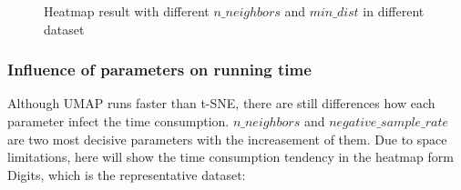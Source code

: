 \begin{enumerate}[1)]
\begin{figure}[H]
\centering  %
\caption{Heatmap result with different $n\_neighbors$ and $min\_dist$ in different dataset}
\end{figure}

\subsubsection{Influence of parameters on running time}

Although UMAP runs faster than t-SNE, there are still differences how each parameter infect the time consumption.  $n\_neighbors$ and $negative\_sample\_rate$ are two most decisive parameters with the increasement of them. Due to space limitations, here will show the time consumption tendency in the heatmap form Digits, which is the representative dataset:


\end{enumerate}
